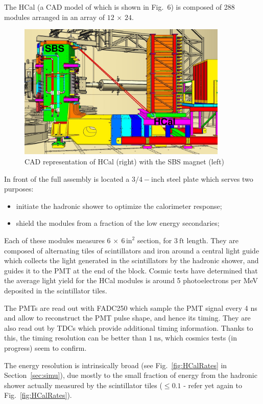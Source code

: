 The HCal (a CAD model of which is shown in Fig.~6)%
is composed of 288 modules arranged in an array of $12\, \times \, 24$.
%
\begin{figure}[!h]
  \centering
    \includegraphics[width=10cm]{Plots/Wines_SBS_CAD_Fall2018.png}
    \caption{CAD representation of HCal (right) with the SBS magnet (left)}
    \label{fig:hcal_cad}
\end{figure}
%
In front of the full assembly is located a $3/4-\mathrm{inch}$ steel plate which serves two purposes:
%
\begin{itemize}
\item{initiate the hadronic shower to optimize the calorimeter response;}
\item{shield the modules from a fraction of the low energy secondaries;}
\end{itemize}
%
Each of these modules measures $6\,\times~6\,\mathrm{in}^2$ section, for $3~\mathrm{ft}$ length. They are composed of alternating tiles of scintillators and iron around a central light guide which collects the light generated in the scintillators by the hadronic shower, and guides it to the PMT at the end of the block.
Cosmic tests have determined that the average light yield for the HCal modules is around 5 photoelectrons per MeV deposited in the scintillator tiles.

The PMTs are read out with FADC250 which sample the PMT signal every 4 ns and allow to reconstruct the PMT pulse shape, and hence its timing.
They are also read out by TDCs which provide additional timing information.
Thanks to this, the timing resolution can be better than $1~\mathrm{ns}$, which cosmics tests (in progress) seem to confirm.

The energy resolution is intrinsically broad (see Fig.~\ref{fig:HCalRates} in Section~\ref{sec:simu}), due mostly to the small fraction of energy from the hadronic shower actually measured by the scintillator tiles ($\leq 0.1$ - refer yet again to Fig.~\ref{fig:HCalRates}).

